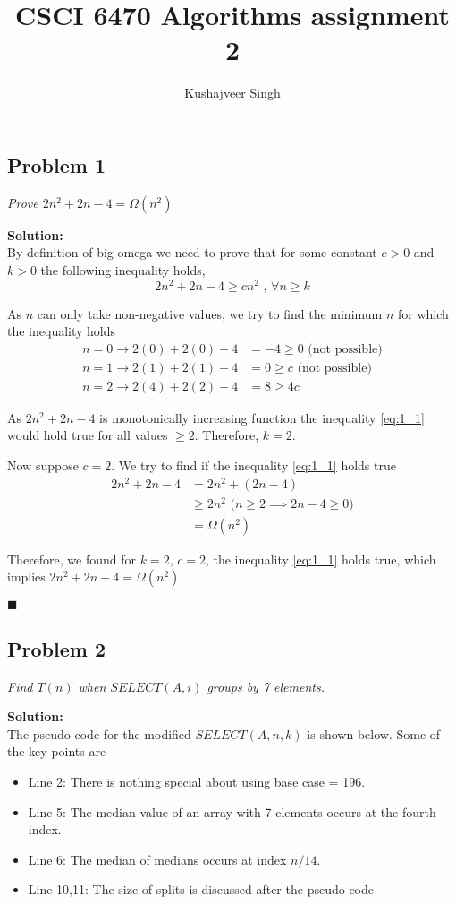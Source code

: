 \documentclass[12pt,a4paper]{article}
\title{CSCI 6470 Algorithms assignment 2}
\author{Kushajveer Singh}
\date{}
\newcommand{\rightqed}{
\begin{flushright}
$\blacksquare$
\end{flushright}
}
\newcommand{\solution}{\noindent\textbf{Solution:}\\\indent}
\begin{document}
\maketitle

\subsection*{Problem 1}
\textit{
    Prove $2n^2+2n-4 = \Omega (n^2)$
}

\solution
By definition of big-omega we need to prove that for some constant $c>0$ and $k>0$ the following inequality holds,
\begin{equation}
    2n^2+2n-4 \geq cn^2 \text{ , $\forall n \geq k$} \label{eq:1_1}
\end{equation}

As $n$ can only take non-negative values, we try to find the minimum $n$ for which the inequality holds
\begin{align*}
    n=0 \rightarrow 2(0)+2(0)-4 &= -4 \geq 0 \text{ (not possible)} \\
    n=1 \rightarrow 2(1)+2(1)-4 &= 0 \geq c \text{ (not possible)} \\
    n=2 \rightarrow 2(4)+2(2)-4 &= 8 \geq 4c
\end{align*}

As $2n^2+2n-4$ is monotonically increasing function the inequality \eqref{eq:1_1} would hold true for all values $\geq 2$. Therefore, $k=2$.

Now suppose $c=2$. We try to find if the inequality \eqref{eq:1_1} holds true
\begin{align*}
    2n^2+2n-4 &= 2n^2 + (2n - 4) \\
              &\geq 2n^2 \text{ ($n \geq 2\implies 2n-4 \geq 0$)}\\
              &= \Omega(n^2)
\end{align*}

Therefore, we found for $k=2$, $c=2$, the inequality \eqref{eq:1_1} holds true, which implies $2n^2+2n-4 = \Omega(n^2)$.
\rightqed

\newpage
\subsection*{Problem 2}
\textit{
    Find $T(n)$ when $SELECT(A,i)$ groups by 7 elements.
}

\solution
The pseudo code for the modified $SELECT(A,n,k)$ is shown below. Some of the key points are
\begin{itemize}
    \item Line 2: There is nothing special about using base case = 196.
    \item Line 5: The median value of an array with 7 elements occurs at the fourth index.
    \item Line 6: The median of medians occurs at index $n/14$.
    \item Line 10,11: The size of splits is discussed after the pseudo code
\end{itemize}
\end{document}
